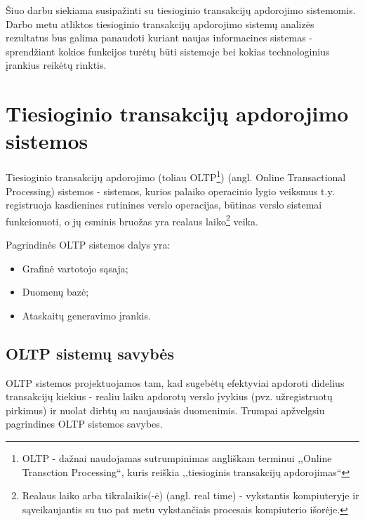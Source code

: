 \documentclass[12pt,a4paper,titlepage]{article}
\begin{document}
Šiuo darbu siekiama susipažinti su tiesioginio transakcijų apdorojimo sistemomis. Darbo metu atliktos tiesioginio transakcijų apdorojimo sistemų analizės rezultatus bus galima panaudoti kuriant naujas informacines sistemas - sprendžiant kokios funkcijos turėtų būti sistemoje bei kokias technologinius įrankius reikėtų rinktis.

\section{Tiesioginio transakcijų apdorojimo sistemos}

\begin{comment}
Online transactional processing (OLTP) is designed to efficiently process high volumes of transactions, instantly recording business events (such as a sales invoice payment) and reflecting changes as they occur.
\end{comment}

Tiesioginio transakcijų apdorojimo (toliau OLTP\footnote{OLTP - dažnai naudojamas sutrumpinimas angliškam terminui ,,Online Transction Processing``, kuris reiškia ,,tiesioginis transakcijų apdorojimas``}) (angl. Online Transactional Processing) sistemos - sistemos, kurios palaiko operacinio lygio veiksmus t.y. registruoja kasdienines rutinines verslo operacijas, būtinas verslo sistemai funkcionuoti, o jų esminis bruožas yra realaus laiko\footnote{Realaus laiko arba tikralaikis(-ė) (angl. real time) - vykstantis kompiuteryje ir sąveikaujantis su tuo pat metu vykstančiais procesais kompiuterio išorėje.\cite{DGJ08}} veika.

Pagrindinės OLTP sistemos dalys yra:
\begin{itemize}
	\item Grafinė vartotojo sąsaja;
	\item Duomenų bazė;
	\item Ataskaitų generavimo įrankis.
\end{itemize}

\subsection{OLTP sistemų savybės}

OLTP sistemos projektuojamos tam, kad sugebėtų efektyviai apdoroti didelius transakcijų kiekius - realiu laiku apdorotų verslo įvykius (pvz. užregistruotų pirkimus) ir nuolat dirbtų su naujausiais duomenimis. Trumpai apžvelgsiu pagrindines OLTP sistemos savybes.\\
\begin{comment}
The nature of OLTP environments is predominantly any kind of interactive ad hoc usage, such as telemarketeers entering telephone survey results. OLTP systems require short response times in order for users to remain productive.
\end{comment}
\end{document}
